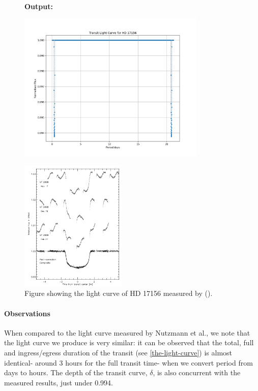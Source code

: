 \documentclass[11pt]{article}
\newcommand*{\figuretitle}[1]{
    	{\textbf{#1}
    	\par\vspace{-1em}}
    }
\begin{document}
\begin{figure}
	\figuretitle{Output:}
	\centering
	\includegraphics[width=0.8\textwidth]{../matplotlib_graphs/transit_1.png}
\end{figure}    


\begin{figure}
	\centering 
	\includegraphics[width=0.45\textwidth]{../images/light_curve.png}
	\caption{Figure showing the light curve of HD 17156 measured by (\cite{Nutzman}).} 
	\label{Figure 4.a}
\end{figure}

    \hypertarget{observations}{%
\paragraph{Observations}\label{observations_1}}

When compared to the light curve measured by Nutzmann et al., we note
that the light curve we produce is very similar: it can be observed that the total, full and ingress/egress duration of the transit (see \ref{the-light-curve}) is almost identical- around 3 hours for the full transit time- when we convert period from days to hours. The depth of the transit curve, \(\delta\), is also concurrent with the measured results, just under 0.994.
\end{document}

